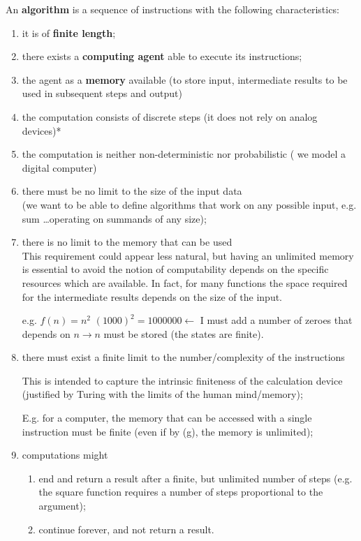 An \textbf{algorithm} is a sequence of instructions with the following characteristics:
\begin{enumerate}[label=\alph*)]
\item
  \label{as:prog_fin}
  it is of \textbf{finite length};
\item there exists a \textbf{computing agent} able to execute its instructions;
\item the agent as a \textbf{memory} available (to store input, intermediate results to be used in subsequent steps and output)
\item the computation consists of discrete steps (it does not rely on analog devices)*
\item the computation is neither non-deterministic nor probabilistic (
  we model a  digital computer)

\item there must be no limit to the size of the input data\\
  (we want to be able to define algorithms that work on any possible
  input, e.g. sum \dots operating on summands of any size);

\item there is no limit to the memory that can be used\\
  This requirement could appear less natural, but having an unlimited
  memory is essential to avoid the notion of computability depends
  on the specific resources which are available. In fact, for many
  functions the space required for the intermediate results depends on
  the size of the input.

  e.g. $f(n) = n^2$ $(1000)^2 = 1000000 \leftarrow$ I must add a
  number of zeroes that depends on $n \rightarrow n$ must be stored
  (the states are finite).

\item
  \label{as:istr_fin}
  there must exist a finite limit to the number/complexity of the
  instructions

  This is intended to capture the intrinsic finiteness of the
  calculation device (justified by Turing with the limits of the human
  mind/memory);

  E.g. for a computer, the memory that can be accessed with a single
  instruction must be finite (even if by (g), the memory is unlimited);

\item computations might
  \begin{enumerate}

  \item  end and return a result after a finite, but unlimited number of steps
    (e.g. the square function requires a number of steps proportional to the argument);

  \item continue forever, and not return a result.
  \end{enumerate}
\end{enumerate}

